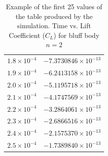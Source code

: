 \begin{table}[H]
\begin{tabular}{|c|c|}
		$1.8 \times 10^{-4}$ & $-7.3730846 \times 10^{-13}$ \\
		$1.9 \times 10^{-4}$ & $-6.2413158 \times 10^{-13}$ \\
		$2.0 \times 10^{-4}$ & $-5.1195718 \times 10^{-13}$ \\
		$2.1 \times 10^{-4}$ & $-4.1747569 \times 10^{-13}$ \\
		$2.2 \times 10^{-4}$ & $-3.2864061 \times 10^{-13}$ \\
		$2.3 \times 10^{-4}$ & $-2.6866516 \times 10^{-13}$ \\
		$2.4 \times 10^{-4}$ & $-2.1575370 \times 10^{-13}$ \\
		$2.5 \times 10^{-4}$ & $-1.7389840 \times 10^{-13}$ \\
		\hline
	\end{tabular}
	\label{tab:1FaceClTable}
	\caption{Example of the first 25 values of the table produced by the simulation. Time vs. Lift Coefficient ($C_L$) for bluff body $n=2$}
\end{table}

